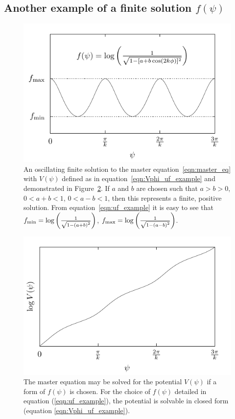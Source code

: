 \subsection{Another example of a finite solution \(f(\psi)\)}
\begin{figure}[tp]
  \centering
  \includegraphics[width=\textwidth]{chapters/kinetic_dominance/figures/uf}
  \caption{An oscillating finite solution to the master equation~\protect\eqref{eqn:master_eq} with \(V(\psi)\) defined as in equation~\protect\eqref{eqn:Vphi_uf_example} and demonstrated in Figure~\protect\ref{fig:figure_ospot}. If \(a\) and \(b\) are chosen such that \(a>b>0\), \(0<a+b<1\), \(0<a-b<1\), then this represents a finite, positive solution.  From equation~\protect\eqref{eqn:uf_example} it is easy to see that \(f_\mathrm{min} = \log\left(\frac{1}{\sqrt{1-{(a+b)}^2}}\right)\), \(f_\mathrm{max}=\log\left(\frac{1}{\sqrt{1-{(a-b)}^2}}\right)\).}\label{fig:figure_uf}
\end{figure}

\begin{figure}[tp]
  \centering
  \includegraphics[width=\textwidth]{chapters/kinetic_dominance/figures/ospot}
  \caption{The master equation may be solved for the potential \(V(\psi)\) if a form of \(f(\psi)\) is chosen. For the choice of \(f(\psi)\) detailed in equation (\protect\ref{eqn:uf_example}), the potential is solvable in closed form (equation \protect\ref{eqn:Vphi_uf_example}).}\label{fig:figure_ospot}
\end{figure}

